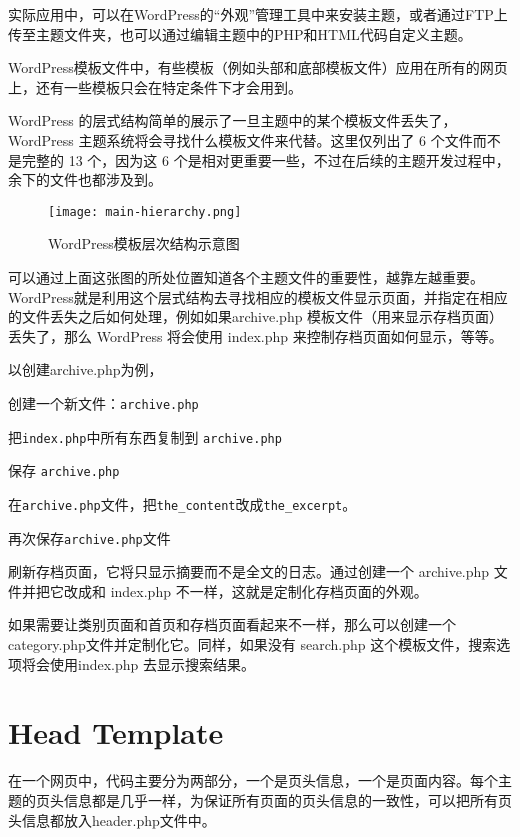 实际应用中，可以在WordPress的“外观”管理工具中来安装主题，或者通过FTP上传至主题文件夹，也可以通过编辑主题中的PHP和HTML代码自定义主题。

WordPress模板文件中，有些模板（例如头部和底部模板文件）应用在所有的网页上，还有一些模板只会在特定条件下才会用到。

WordPress 的层式结构简单的展示了一旦主题中的某个模板文件丢失了，WordPress 主题系统将会寻找什么模板文件来代替。这里仅列出了 6 个文件而不是完整的 13 个，因为这 6 个是相对更重要一些，不过在后续的主题开发过程中，余下的文件也都涉及到。

\begin{figure}[!ht]
\centering
\texttt{[image: main-hierarchy.png]}
\caption{WordPress模板层次结构示意图}
\end{figure}

可以通过上面这张图的所处位置知道各个主题文件的重要性，越靠左越重要。WordPress就是利用这个层式结构去寻找相应的模板文件显示页面，并指定在相应的文件丢失之后如何处理，例如如果archive.php 模板文件（用来显示存档页面）丢失了，那么 WordPress 将会使用 index.php 来控制存档页面如何显示，等等。


以创建archive.php为例，

\begin{compactitem}
\item 创建一个新文件：\texttt{archive.php}
\item 把\texttt{index.php}中所有东西复制到 \texttt{archive.php}
\item 保存 \texttt{archive.php}
\item 在\texttt{archive.php}文件，把\texttt{the\_content}改成\texttt{the\_excerpt}。
\item 再次保存\texttt{archive.php}文件
\end{compactitem}


刷新存档页面，它将只显示摘要而不是全文的日志。通过创建一个 archive.php 文件并把它改成和 index.php 不一样，这就是定制化存档页面的外观。

如果需要让类别页面和首页和存档页面看起来不一样，那么可以创建一个category.php文件并定制化它。同样，如果没有 search.php 这个模板文件，搜索选项将会使用index.php 去显示搜索结果。





\section{Head Template}

在一个网页中，代码主要分为两部分，一个是页头信息，一个是页面内容。每个主题的页头信息都是几乎一样，为保证所有页面的页头信息的一致性，可以把所有页头信息都放入header.php文件中。

